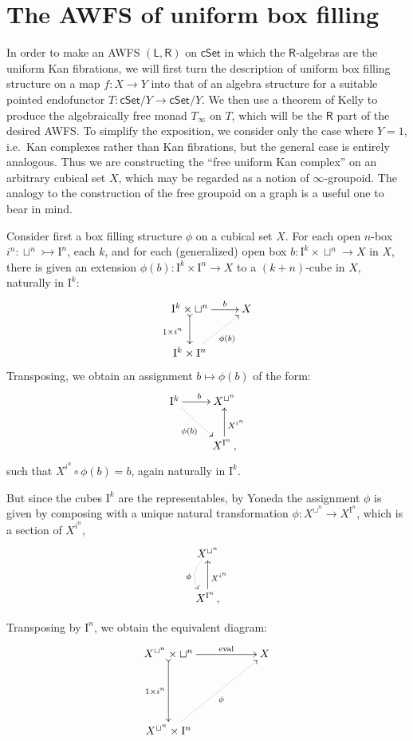 \documentclass[12pt]{article}
\newcommand{\cSet}{\ensuremath{\mathsf{cSet}}}
\newcommand{\LL}{\ensuremath{\mathsf{L}}}
\newcommand{\RR}{\ensuremath{\mathsf{R}}}
\newcommand{\eval}{\ensuremath{\mathrm{eval}}}
\newcommand{\mono}{\ensuremath{\rightarrowtail}}
\newcommand{\I}{\ensuremath{\mathrm{I}}}
\theoremstyle{remark}
\theoremstyle{definition}
\begin{document}
\section{The AWFS of uniform box filling}


In order to make an AWFS $(\LL,\RR)$ on $\cSet$ in which the $\RR$-algebras are the uniform Kan fibrations, we will first turn the description of uniform box filling structure on a map $f : X\to Y$ into that of an algebra structure for a suitable pointed endofunctor $T : \cSet/Y\to\cSet/Y$.  We then use a theorem of Kelly \cite{Kelly} to produce the algebraically free monad $T_\infty$ on $T$, which will be the $\RR$ part of the desired AWFS.  To simplify the exposition, we consider only the case where $Y=1$, i.e.\ Kan complexes rather than Kan fibrations, but the general case is entirely analogous.  Thus we are constructing the ``free uniform Kan complex'' on an arbitrary cubical set $X$, which may be regarded as a notion of $\infty$-groupoid.  The analogy to the construction of the free groupoid on a graph is a useful one to bear in mind.

Consider first a box filling structure $\phi$ on a cubical set $X$.  For each open $n$-box $i^n:\sqcup^n \mono \I^n$, each $k$, and for each (generalized) open box $b: \I^k \times\sqcup^n\to X$ in $X$, there is given an extension $\phi(b) : \I^k\times\I^n \to X$ to a $(k+n)$-cube in $X$, naturally in $\I^k$:
\[
\xymatrix{
\I^k\times \sqcup^n\ar@{>->}[d]_{1\times i^n\ } \ar[r]^-{b}  & X\\
 \I^k \times \I^n \ar@{..>}[ru]_{\phi(b)} &
}
\]
Transposing, we obtain an assignment $b \mapsto \phi(b)$ of the form:
\[
\xymatrix{
\I^k \ar[r]^{b}  \ar@{..>}[rd]_{\phi(b)}  & X^{ \sqcup^n}\\
 & \ar[u]_{X^{i^n}}  X^{ \I^n}\,,
}
\]
such that $X^{i^n}\circ\phi(b) = b$, again naturally in $\I^k$.

But since the cubes $\I^k$ are the representables, by Yoneda the assignment $\phi$ is given by composing with a unique natural transformation $\phi : X^{\sqcup^n}\to X^{\I^n}$, which is a section of $X^{i^n}$,
\[
\xymatrix{
  \ar@/{}_{1pc}/@{..>}[d]_{\phi} X^{ \sqcup^n}\\
  \ar[u]_{X^{i^n}}  X^{ \I^n}\,,
}
\]

Transposing by $\I^n$, we obtain the equivalent diagram:
\[
\xymatrix{
 X^{\sqcup^n}\times\sqcup^n \ar@{>->}[dd]_-{1\times i^n} \ar[rr]^-{\eval} && X \\
&& \\
 X^{\sqcup^n}\times\I^n \ar@{..>}[uurr]_{\phi} &&
}
\]
\end{document}
